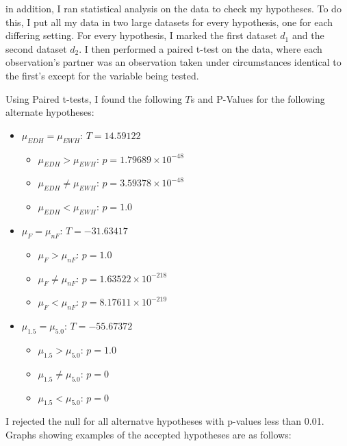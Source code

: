 \documentclass{beamer}
\begin{document}
\begin{frame}
  in addition, I ran statistical analysis on the data to check my hypotheses. To do this, I put all my data in two large datasets for every hypothesis, one for each differing setting. For every hypothesis, I marked the first dataset $d_{1}$ and the second dataset $d_{2}$. I then performed a paired t-test on the data, where each observation's partner was an observation taken under circumstances identical to the first's except for the variable being tested. 
\end{frame}

\begin{frame}
\end{frame}

\begin{frame}
  Using Paired t-tests, I found the following $T$s and P-Values for the following alternate hypotheses:
  \begin{itemize}
  \item $\mu_{EDH}=\mu_{EWH}$: $T=14.59122$
    \begin{itemize}
    \item $\mu_{EDH}>\mu_{EWH}$: $p=1.79689\times10^{-48}$
    \item $\mu_{EDH}\neq\mu_{EWH}$: $p=3.59378\times10^{-48}$
    \item $\mu_{EDH}<\mu_{EWH}$: $p=1.0$
    \end{itemize}  
  \item $\mu_{F}=\mu_{nF}$: $T=-31.63417$
    \begin{itemize}
    \item $\mu_{F}>\mu_{nF}$: $p=1.0$
    \item $\mu_{F}\neq\mu_{nF}$: $p=1.63522\times10^{-218}$
    \item $\mu_{F}<\mu_{nF}$: $p=8.17611\times10^{-219}$
    \end{itemize}
  \item $\mu_{1.5}=\mu_{5.0}$: $T=-55.67372$
    \begin{itemize}
    \item $\mu_{1.5}>\mu_{5.0}$: $p=1.0$
    \item $\mu_{1.5}\neq\mu_{5.0}$: $p=0$
    \item $\mu_{1.5}<\mu_{5.0}$: $p=0$
    \end{itemize}
  \end{itemize}
  I rejected the null for all alternatve hypotheses with p-values less than 0.01. Graphs showing examples of the accepted hypotheses are as follows:
\end{frame}
\end{document}
